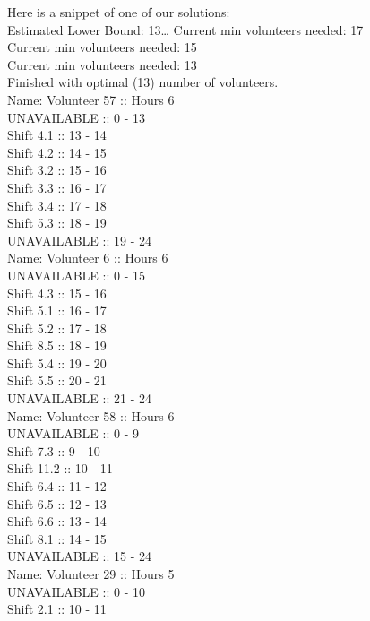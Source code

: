 \documentclass[12pt]{article}
\theoremstyle{definition}
\begin{document}
\begin{multicols}{2}
Here is a snippet of one of our solutions:\\
\vspace{2mm}
Estimated Lower Bound: 13\ldots
Current min volunteers needed: 17\\
Current min volunteers needed: 15\\
Current min volunteers needed: 13\\
Finished with optimal (13) number of volunteers.\\
Name: Volunteer 57 :: Hours 6\\
        UNAVAILABLE :: 0 - 13\\
        Shift 4.1 :: 13 - 14\\
        Shift 4.2 :: 14 - 15\\
        Shift 3.2 :: 15 - 16\\
        Shift 3.3 :: 16 - 17\\
        Shift 3.4 :: 17 - 18\\
        Shift 5.3 :: 18 - 19\\
        UNAVAILABLE :: 19 - 24\\
Name: Volunteer 6 :: Hours 6\\
        UNAVAILABLE :: 0 - 15\\
        Shift 4.3 :: 15 - 16\\
        Shift 5.1 :: 16 - 17\\
        Shift 5.2 :: 17 - 18\\
        Shift 8.5 :: 18 - 19\\
        Shift 5.4 :: 19 - 20\\
        Shift 5.5 :: 20 - 21\\
        UNAVAILABLE :: 21 - 24\\
Name: Volunteer 58 :: Hours 6\\
        UNAVAILABLE :: 0 - 9\\
        Shift 7.3 :: 9 - 10\\
        Shift 11.2 :: 10 - 11\\
        Shift 6.4 :: 11 - 12\\
        Shift 6.5 :: 12 - 13\\
        Shift 6.6 :: 13 - 14\\
        Shift 8.1 :: 14 - 15\\
        UNAVAILABLE :: 15 - 24\\
Name: Volunteer 29 :: Hours 5\\
        UNAVAILABLE :: 0 - 10\\
        Shift 2.1 :: 10 - 11\\

\end{multicols}
\end{document}
